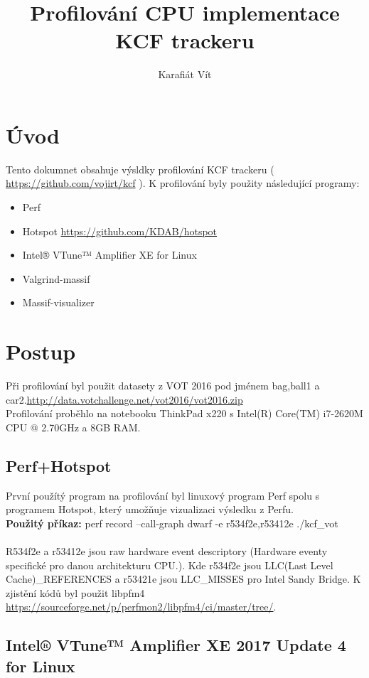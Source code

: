\documentclass{article}
\title{Profilování CPU implementace KCF trackeru}
\author{Karafiát Vít}
\begin{document}
\maketitle
\newpage
\tableofcontents
\newpage
{}
	
\section{Úvod}
Tento dokumnet obsahuje výsldky profilování KCF trackeru ( \url{https://github.com/vojirt/kcf} ). K profilování byly použity následující programy:
\begin{itemize}
	\item Perf
	\item Hotspot \url{https://github.com/KDAB/hotspot}
	\item Intel® VTune™ Amplifier XE for Linux
	\item Valgrind-massif
	\item Massif-visualizer
\end{itemize}

\section{Postup}
Při profilování byl použit datasety z VOT 2016 pod jménem bag,ball1 a car2.\url{http://data.votchallenge.net/vot2016/vot2016.zip}\\
Profilování proběhlo na notebooku ThinkPad x220 s Intel(R) Core(TM) i7-2620M CPU @ 2.70GHz a 8GB RAM.

\subsection{Perf+Hotspot}
\label{Perf}
První použítý program na profilování byl linuxový program Perf spolu s programem Hotspot, který umožňuje vizualizaci výsledku z Perfu.\\
\newline
\textbf{Použitý příkaz:} perf record --call-graph dwarf -e r534f2e,r53412e ./kcf\_vot\\\\
R534f2e a r53412e jsou raw hardware event descriptory (Hardware eventy specifické pro danou architekturu CPU.). Kde r534f2e jsou LLC(Last Level Cache)\_REFERENCES a r53421e jsou LLC\_MISSES pro Intel Sandy Bridge. K zjistění kódů byl použit libpfm4 \url{https://sourceforge.net/p/perfmon2/libpfm4/ci/master/tree/}.

\subsection{Intel® VTune™ Amplifier XE 2017 Update 4 for Linux}
\end{document}
